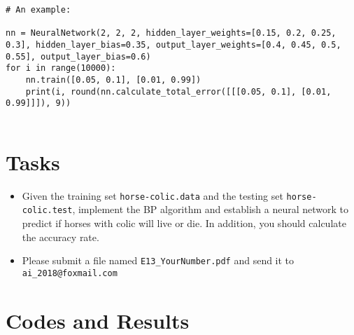 ﻿\documentclass[a4paper, 11pt]{article}
\begin{document}
\begin{enumerate}
\begin{lstlisting}
# An example:

nn = NeuralNetwork(2, 2, 2, hidden_layer_weights=[0.15, 0.2, 0.25, 0.3], hidden_layer_bias=0.35, output_layer_weights=[0.4, 0.45, 0.5, 0.55], output_layer_bias=0.6)
for i in range(10000):
    nn.train([0.05, 0.1], [0.01, 0.99])
    print(i, round(nn.calculate_total_error([[[0.05, 0.1], [0.01, 0.99]]]), 9))


	\end{lstlisting}

\end{enumerate}
\section{Tasks}
\begin{itemize}
	\item Given the training set \texttt{horse-colic.data} and the testing set \texttt{horse-colic.test}, implement the BP algorithm and establish a neural network to predict if horses with colic will live or die. In addition, you should calculate the accuracy rate.
	\item Please submit a file named \texttt{E13\_YourNumber.pdf} and send it to \texttt{ai\_2018@foxmail.com}
\end{itemize}
\section{Codes and Results}


%
%
\end{document}
